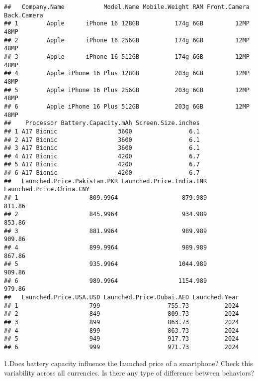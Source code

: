 \documentclass[
]{article}
\begin{document}
\begin{verbatim}
##   Company.Name           Model.Name Mobile.Weight RAM Front.Camera Back.Camera
## 1        Apple      iPhone 16 128GB          174g 6GB         12MP        48MP
## 2        Apple      iPhone 16 256GB          174g 6GB         12MP        48MP
## 3        Apple      iPhone 16 512GB          174g 6GB         12MP        48MP
## 4        Apple iPhone 16 Plus 128GB          203g 6GB         12MP        48MP
## 5        Apple iPhone 16 Plus 256GB          203g 6GB         12MP        48MP
## 6        Apple iPhone 16 Plus 512GB          203g 6GB         12MP        48MP
##    Processor Battery.Capacity.mAh Screen.Size.inches
## 1 A17 Bionic                 3600                6.1
## 2 A17 Bionic                 3600                6.1
## 3 A17 Bionic                 3600                6.1
## 4 A17 Bionic                 4200                6.7
## 5 A17 Bionic                 4200                6.7
## 6 A17 Bionic                 4200                6.7
##   Launched.Price.Pakistan.PKR Launched.Price.India.INR Launched.Price.China.CNY
## 1                    809.9964                  879.989                   811.86
## 2                    845.9964                  934.989                   853.86
## 3                    881.9964                  989.989                   909.86
## 4                    899.9964                  989.989                   867.86
## 5                    935.9964                 1044.989                   909.86
## 6                    989.9964                 1154.989                   979.86
##   Launched.Price.USA.USD Launched.Price.Dubai.AED Launched.Year
## 1                    799                   755.73          2024
## 2                    849                   809.73          2024
## 3                    899                   863.73          2024
## 4                    899                   863.73          2024
## 5                    949                   917.73          2024
## 6                    999                   971.73          2024
\end{verbatim}

1.Does battery capacity influence the launched price of a smartphone?
Check this variability across all currencies. Is there any type of
difference between behaviors?
\end{document}
